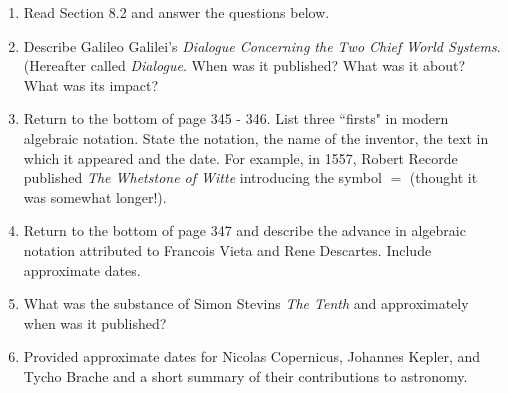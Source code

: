 \documentclass[12pt]{article}
\begin{document}
\begin{enumerate}
\item Read Section 8.2 and answer the questions below.
\item Describe Galileo Galilei's \textit{Dialogue Concerning the Two Chief World Systems}. (Hereafter called \textit{Dialogue}. When was it published? What was it about? What was its impact?
\vfill
\item Return to the bottom of page 345 - 346. List three ``firsts" in modern algebraic notation. State the notation, the name of the inventor, the text in which it appeared and the date. For example, in 1557, Robert Recorde published \textit{The Whetstone of Witte} introducing the symbol $=$ (thought it was somewhat longer!).
\vfill
\item Return to the bottom of page 347 and describe the advance in algebraic notation attributed to Francois Vieta and Rene Descartes. Include approximate dates.
\vfill
\item What was the substance of Simon Stevins \textit{The Tenth} and approximately when was it published?
\vfill
\item Provided approximate dates for Nicolas Copernicus, Johannes Kepler, and Tycho Brache and a short summary of their contributions to astronomy.
\vfill
\end{enumerate}
\end{document}
